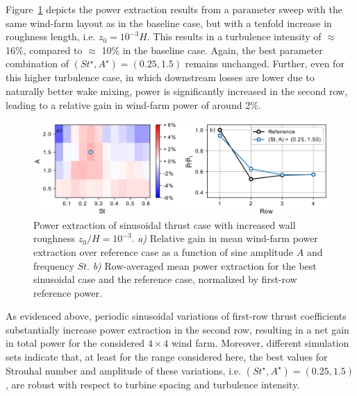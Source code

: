 Figure~\ref{fig:sinus_roughness} depicts the power extraction results from a parameter sweep with the same wind-farm layout as in the baseline case, but with a tenfold increase in roughness length, i.e. $z_0 = 10^{-3}H$. This results in a turbulence intensity of $\approx$ 16\%, compared to $\approx$ 10\% in the baseline case. Again, the best parameter combination of $(St^\star, A^\star) = (0.25, 1.5)$ remains unchanged. Further, even for this higher turbulence case, in which downstream losses are lower due to naturally better wake mixing, power is significantly increased in the second row, leading to a relative gain in wind-farm power of around 2\%. 
\begin{figure}
	\centering
	\includegraphics[width=\textwidth]{chapters/analysis_induction_control/gains_turbulent_6D_6D_6D_wide_antiphase_z0_1m2.eps}
	\caption{Power extraction of sinusoidal thrust case with increased wall roughness $z_0/H = 10^{-3}$. \emph{a) } Relative gain in mean wind-farm power extraction over reference case as a function of sine amplitude $A$ and frequency $St$. \emph{b) } Row-averaged mean power extraction for the best sinusoidal case and the reference case, normalized by first-row reference power.\label{fig:sinus_roughness} }
\end{figure}


As evidenced above, periodic sinusoidal variations of first-row thrust coefficients substantially increase power extraction in the second row, resulting in a net gain in total power for the considered $4\times4$ wind farm. Moreover, different simulation sets indicate that, at least for the range considered here, the best values for Strouhal number and amplitude of these variations, i.e. $(St^\star, A^\star) = (0.25, 1.5)$, are robust with respect to turbine spacing and turbulence intensity. 

